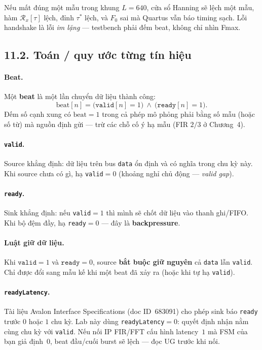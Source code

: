 Nếu mất đúng một mẫu trong khung $L=640$, cửa sổ Hanning sẽ lệch một mẫu, hàm $\mathcal{R}_x[\tau]$ lệch, đỉnh $\tau^*$ lệch, và $F_0$ sai mà Quartus vẫn báo timing sạch. Lỗi handshake là lỗi \emph{im lặng} --- testbench phải đếm beat, không chỉ nhìn Fmax.

\subsection*{11.2. Toán / quy ước từng tín hiệu}

\paragraph{Beat.} Một \textbf{beat} là một lần chuyển dữ liệu thành công:
\begin{equation}
\mathrm{beat}[n] = \bigl(\texttt{valid}[n]=1\bigr)\ \land\ \bigl(\texttt{ready}[n]=1\bigr).
\end{equation}
Đếm số cạnh xung có $\mathrm{beat}=1$ trong cả phép mô phỏng phải bằng số mẫu (hoặc số từ) mà nguồn định gửi --- trừ các chỗ cố ý hạ mẫu (FIR $2/3$ ở Chương~4).

\paragraph{\texttt{valid}.} Source khẳng định: dữ liệu trên bus \texttt{data} ổn định và có nghĩa trong chu kỳ này. Khi source chưa có gì, hạ \texttt{valid}$=0$ (khoảng nghỉ chủ động --- \emph{valid gap}).

\paragraph{\texttt{ready}.} Sink khẳng định: nếu \texttt{valid}$=1$ thì mình sẽ chốt dữ liệu vào thanh ghi/FIFO. Khi bộ đệm đầy, hạ \texttt{ready}$=0$ --- đây là \textbf{backpressure}.

\paragraph{Luật giữ dữ liệu.} Khi $\texttt{valid}=1$ và $\texttt{ready}=0$, source \textbf{bắt buộc giữ nguyên} cả \texttt{data} lẫn \texttt{valid}. Chỉ được đổi sang mẫu kế khi một beat đã xảy ra (hoặc khi tự hạ \texttt{valid}).

\paragraph{\texttt{readyLatency}.} Tài liệu Avalon Interface Specifications (doc ID~683091) cho phép sink báo \texttt{ready} trước $0$ hoặc $1$ chu kỳ. Lab này dùng \texttt{readyLatency}$=0$: quyết định nhận nằm cùng chu kỳ với \texttt{valid}. Nếu nối IP FIR/FFT cấu hình latency~$1$ mà FSM của bạn giả định~$0$, beat đầu/cuối burst sẽ lệch --- đọc UG trước khi nối.

